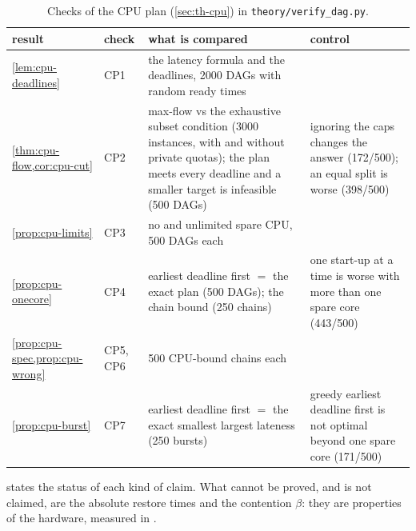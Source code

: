 \begin{table}[t]
\centering
\caption{Checks of the CPU plan (\cref{sec:th-cpu}) in \texttt{theory/verify\_dag.py}.}
\label{tab:checks-cpu}
\small
\begin{tabular}{@{}p{}p{}p{}p{}@{}}
\toprule
result & check & what is compared & control \\
\midrule
\cref{lem:cpu-deadlines} & CP1 & the latency formula and the deadlines, 2000 DAGs with random
  ready times & \\
\cref{thm:cpu-flow,cor:cpu-cut} & CP2 & max-flow vs the exhaustive subset condition (3000
  instances, with and without private quotas); the plan meets every deadline and a smaller target
  is infeasible (500 DAGs) & ignoring the caps changes the answer (172/500); an equal split is
  worse (398/500) \\
\cref{prop:cpu-limits} & CP3 & no and unlimited spare CPU, 500 DAGs each & \\
\cref{prop:cpu-onecore} & CP4 & earliest deadline first $=$ the exact plan (500 DAGs); the chain
  bound (250 chains) & one start-up at a time is worse with more than one spare core (443/500) \\
\cref{prop:cpu-spec,prop:cpu-wrong} & CP5, CP6 & 500 CPU-bound chains each & \\
\cref{prop:cpu-burst} & CP7 & earliest deadline first $=$ the exact smallest largest lateness
  (250 bursts) & greedy earliest deadline first is not optimal beyond one spare core (171/500) \\
\bottomrule
\end{tabular}
\end{table}

 states the status of each kind of claim. What cannot be proved, and is not
claimed, are the absolute restore times and the contention $\beta$: they are properties of the
hardware, measured in .

